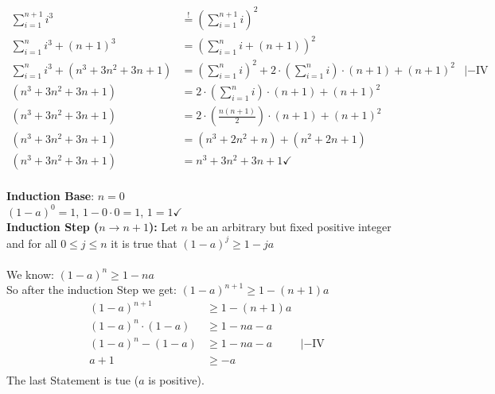 \begin{align*}
    \sum_{i = 1}^{n+1} i^3                 & \stackrel{!}{=} \left(\sum_{i=1}^{n+1} i \right)^2                                                             \\
    \sum_{i = 1}^{n} i^3 + (n+1)^3         & = \left(\sum_{i=1}^{n} i  + (n+1)\right)^2                                                                     \\
    \sum_{i = 1}^{n} i^3 + (n^3+3n^2+3n+1) & = \left(\sum_{i=1}^{n} i\right)^2 + 2\cdot \left(\sum_{i=1}^{n} i\right) \cdot(n+1)  + (n+1)^2 & | - \text{IV} \\
    (n^3+3n^2+3n+1)                        & =  2\cdot \left(\sum_{i=1}^{n} i\right) \cdot(n+1)  + (n+1)^2                                                  \\
    (n^3+3n^2+3n+1)                        & =  2\cdot \left(\frac{n(n+1)}{2}\right) \cdot(n+1)  + (n+1)^2                                                  \\
    (n^3+3n^2+3n+1)                        & =  (n^3+2n^2+n)  + (n^2+2n+1)                                                                                  \\
    (n^3+3n^2+3n+1)                        & =  n^3+3n^2+3n+1 \checkmark                                                                                    \\
\end{align*}

\label{ex:section1-2:9}

\textbf{Induction Base}: $n = 0$ \\
$(1-a)^0 = 1$, $1-0 \cdot 0 = 1$, $1=1 \checkmark$ \\

\textbf{Induction Step ($n \rightarrow n+1$):} Let $n$ be an arbitrary but fixed positive integer and for all $0 \leq j \leq n$ it is true that $(1-a)^j \geq 1-ja$ \\ \\

We know: $(1-a)^n \geq 1-na$ \\
So after the induction Step we get: $(1-a)^{n+1} \geq 1-(n+1)a$ \\
\begin{align*}
    (1-a)^{n+1}           & \geq 1-(n+1)a                 \\
    (1-a)^{n} \cdot (1-a) & \geq 1-na-a                   \\
    (1-a)^{n} - (1-a)     & \geq 1-na-a   & | - \text{IV} \\
    a+1                   & \geq -a                       \\
\end{align*}
The last Statement is tue ($a$ is positive).


